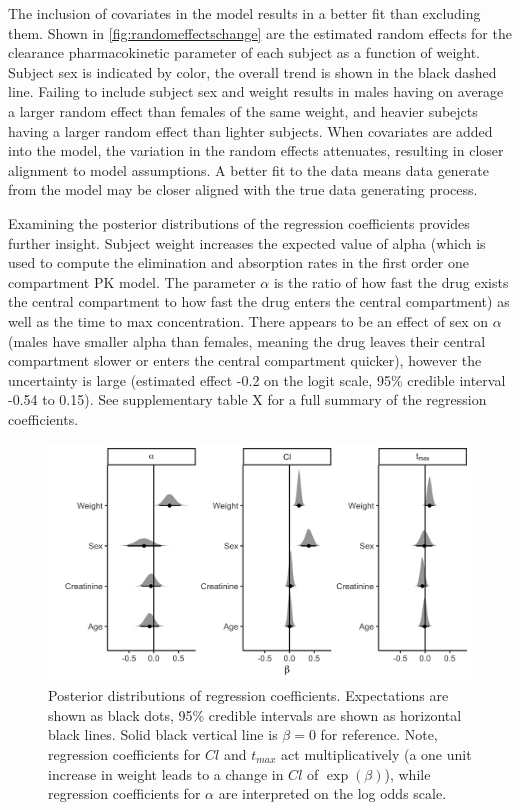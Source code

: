 The inclusion of covariates in the model results in a better fit than excluding them. Shown in \cref{fig:randomeffectschange} are the estimated random effects for the clearance pharmacokinetic parameter of each subject as a function of weight.  Subject sex is indicated by color, the overall trend is shown in the black dashed line.  Failing to include subject sex and weight results in males having on average a larger random effect than females of the same weight, and heavier subejcts having a larger random effect than lighter subjects.  When covariates are added into the model, the variation in the random effects attenuates, resulting in closer alignment to model assumptions. A better fit to the data means data generate from the model may be closer aligned with the true data generating process.

Examining the posterior distributions of the regression coefficients provides further insight.  Subject weight increases the expected value of alpha (which is used to compute the elimination and absorption rates in the first order one compartment PK model.  The parameter $ \alpha $ is the ratio of how fast the drug exists the central compartment to how fast the drug enters the central compartment) as well as the time to max concentration.  There appears to be an effect of sex on $ \alpha $ (males have smaller alpha than females, meaning the drug leaves their central compartment slower or enters the central compartment quicker), however the uncertainty is large (estimated effect -0.2 on the logit scale, 95\% credible interval -0.54 to 0.15). See supplementary table X for a full summary of the regression coefficients.


\begin{figure}
	\centering
	\includegraphics[width=1\linewidth]{figures/coef_vals}
	\caption{Posterior distributions of regression coefficients. Expectations are shown as black dots, 95\% credible intervals are shown as horizontal black lines.  Solid black vertical line is $\beta=0$ for reference.  Note, regression coefficients for $Cl$ and $t_{max}$ act multiplicatively (a one unit increase in weight leads to a change in $Cl$ of $\exp(\beta)$), while regression coefficients for $\alpha$ are interpreted on the log odds scale.}
	\label{fig:coefvals}
\end{figure}


